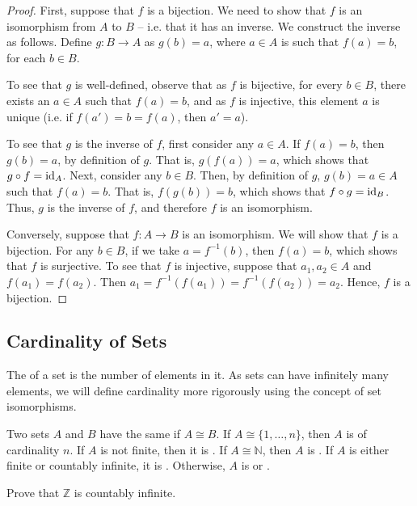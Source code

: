 \begin{proof}
First, suppose that $f$ is a bijection. We need to show that $f$ is an isomorphism from $A$ to $B$ -- i.e. that it has an inverse. We construct the inverse as follows. Define $g \colon B \to A$ as $g(b) = a$, where $a \in A$ is such that $f(a) = b$, for each $b \in B$.

To see that $g$ is well-defined, observe that as $f$ is bijective, for every $b \in B$, there exists an $a \in A$ such that $f(a) = b$, and as $f$ is injective, this element $a$ is unique (i.e. if $f(a') = b = f(a)$, then $a' = a$).

To see that $g$ is the inverse of $f$, first consider any $a \in A$. If $f(a) = b$, then $g(b) = a$, by definition of $g$. That is, $g(f(a)) = a$, which shows that $g \circ f = \mathrm{id}_A$. Next, consider any $b \in B$. Then, by definition of $g$, $g(b) = a \in A$ such that $f(a) = b$. That is, $f(g(b)) = b$, which shows that $f \circ g = \mathrm{id}_B$. Thus, $g$ is the inverse of $f$, and therefore $f$ is an isomorphism.

Conversely, suppose that $f \colon A \to B$ is an isomorphism. We will show that $f$ is a bijection. For any $b \in B$, if we take $a = f^{-1}(b)$, then $f(a) = b$, which shows that $f$ is surjective. To see that $f$ is injective, suppose that $a_1, a_2 \in A$ and $f(a_1) = f(a_2)$. Then $a_1 = f^{-1}(f(a_1)) = f^{-1}(f(a_2)) = a_2$. Hence, $f$ is a bijection.
\end{proof}

\subsection{Cardinality of Sets}\label{subsec:Cardinality}
The  of a set is the number of elements in it. As sets can have infinitely many elements, we will define cardinality more rigorously using the concept of set isomorphisms.

\begin{Definition}
Two sets $A$ and $B$ have the same  if $A \cong B$. If $A \cong \{1, \ldots, n\}$, then $A$ is  of cardinality $n$. If $A$ is not finite, then it is . If $A \cong \mathbb N$, then $A$ is . If $A$ is either finite or countably infinite, it is . Otherwise, $A$ is  or .
\end{Definition}

\begin{Exercise}
Prove that $\mathbb Z$ is countably infinite.
\end{Exercise}

